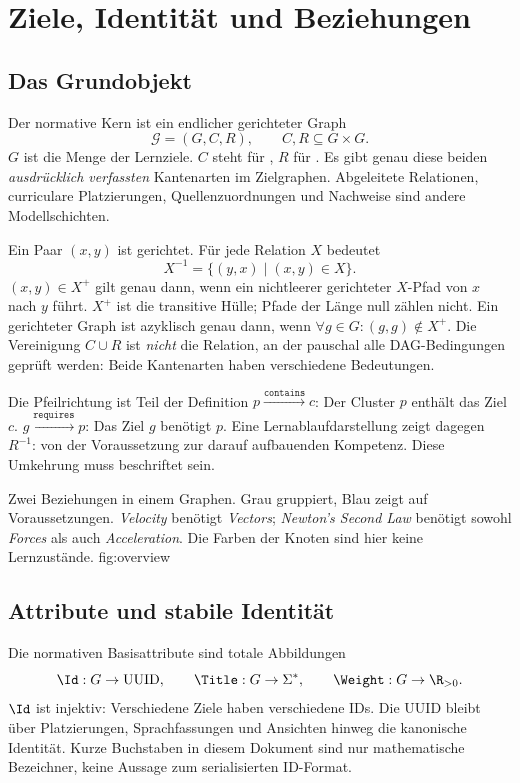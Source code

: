 \section{Ziele, Identität und Beziehungen}
\label{sec:core}
\subsection{Das Grundobjekt}
Der normative Kern ist ein endlicher gerichteter Graph
\[
 \mathcal G=(G,C,R),\qquad C,R\subseteq G\times G.
\]
$G$ ist die Menge der Lernziele. $C$ steht für ,
$R$ für . Es gibt genau diese beiden \emph{ausdrücklich
verfassten} Kantenarten im Zielgraphen. Abgeleitete Relationen, curriculare
Platzierungen, Quellenzuordnungen und Nachweise sind andere Modellschichten.

Ein Paar $(x,y)$ ist gerichtet. Für jede Relation $X$ bedeutet
\[
 X^{-1}=\{(y,x)\mid(x,y)\in X\}.
\]
$(x,y)\in X^+$ gilt genau dann, wenn ein nichtleerer gerichteter $X$-Pfad
von $x$ nach $y$ führt. $X^+$ ist die transitive Hülle;
Pfade der Länge null zählen nicht.
Ein gerichteter Graph ist azyklisch genau dann, wenn
$\forall g\in G:(g,g)\notin X^+$. Die Vereinigung $C\cup R$ ist
\emph{nicht} die Relation, an der pauschal alle DAG-Bedingungen geprüft werden:
Beide Kantenarten haben verschiedene Bedeutungen.

\begin{principle}{Die Pfeilrichtung ist Teil der Definition}
$p\xrightarrow{\texttt{contains}}c$: Der Cluster $p$ enthält das Ziel $c$.
\quad
$g\xrightarrow{\texttt{requires}}p$: Das Ziel $g$ benötigt $p$.
Eine Lernablaufdarstellung zeigt dagegen $R^{-1}$: von der Voraussetzung
zur darauf aufbauenden Kompetenz. Diese Umkehrung muss beschriftet sein.
\end{principle}

{Zwei Beziehungen in einem Graphen. Grau gruppiert, Blau zeigt auf
Voraussetzungen. \emph{Velocity} benötigt \emph{Vectors};
\emph{Newton's Second Law} benötigt sowohl \emph{Forces} als auch
\emph{Acceleration}. Die Farben der Knoten sind hier keine Lernzustände.}
{fig:overview}

\subsection{Attribute und stabile Identität}
Die normativen Basisattribute sind totale Abbildungen
\[
 \Id:G\to\mathrm{UUID},\qquad \Title:G\to\Sigma^*,\qquad
 \Weight:G\to\R_{>0}.
\]
$\Id$ ist injektiv: Verschiedene Ziele haben verschiedene IDs.
Die UUID bleibt über Platzierungen, Sprachfassungen und Ansichten hinweg
die kanonische Identität. Kurze Buchstaben in diesem Dokument sind nur
mathematische Bezeichner, keine Aussage zum serialisierten ID-Format.

